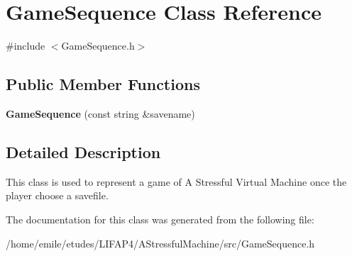 \hypertarget{classGameSequence}{}\section{Game\+Sequence Class Reference}
\label{classGameSequence}


{\ttfamily \#include $<$Game\+Sequence.\+h$>$}

\subsection*{Public Member Functions}
\begin{DoxyCompactItemize}
\item 
\mbox{\label{classGameSequence_a0bfc16f676e1225e4bba6340828aece5}} 
{\bfseries Game\+Sequence} (const string \&savename)
\end{DoxyCompactItemize}


\subsection{Detailed Description}
This class is used to represent a game of A Stressful Virtual Machine once the player choose a savefile. 

The documentation for this class was generated from the following file\+:\begin{DoxyCompactItemize}
\item 
/home/emile/etudes/\+L\+I\+F\+A\+P4/\+A\+Stressful\+Machine/src/Game\+Sequence.\+h\end{DoxyCompactItemize}
